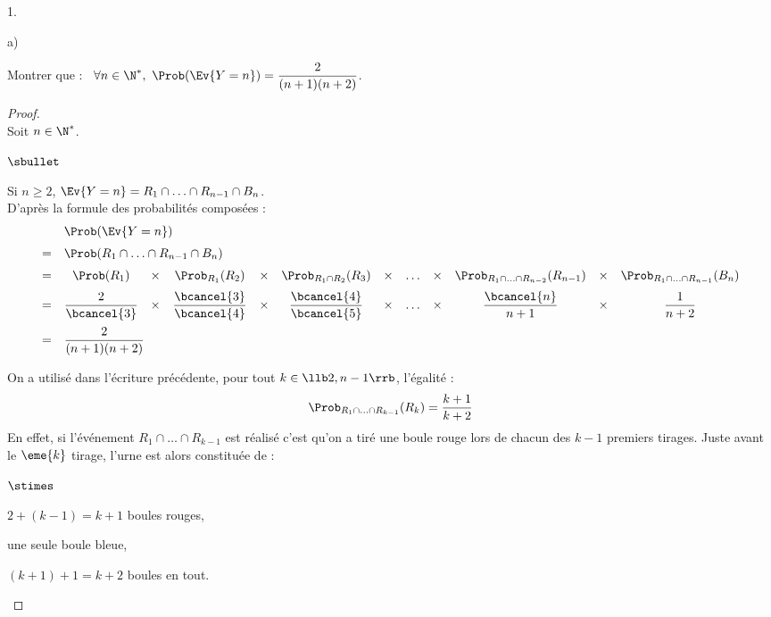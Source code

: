 \documentclass[11pt]{article}%
\begin{document}
\begin{noliste}{1.}
  \setcounter{enumi}{2}
\item
  \begin{noliste}{a)}
  \item Montrer que : \ $\forall n \in \N^*, \ \Prob(\Ev{Y = n}) =
    \dfrac{2}{(n+1)(n+2)}$.

    \begin{proof}~\\
      Soit $n \in \N^*$.
      \begin{noliste}{$\sbullet$}
      \item Si $n \geq 2$, $\Ev{Y = n} = R_1 \cap \ldots \cap 
      R_{n-1} \cap B_n$.\\
        D'après la formule des probabilités composées :
        \[
        \begin{array}{cccccccccccc}
          & \multicolumn{11}{l}{\Prob(\Ev{Y = n})} \\[.2cm]
          = & \multicolumn{11}{l}{\Prob(R_1 \cap \ldots \cap R_{n-1}
            \cap B_n)} \\[.2cm] 
          = & \Prob(R_1) & \times & \Prob_{R_1}(R_2) & \times & 
	  \Prob_{R_1
            \cap R_2}(R_3) & \times & \ldots & \times & \Prob_{R_1 \cap 
	    \ldots
            \cap R_{n-2}}(R_{n-1}) & \times & \Prob_{R_1 \cap \ldots 
	    \cap
            R_{n-1}}(B_n) \\[.2cm]
          = & \dfrac{2}{\bcancel{3}} & \times &
          \dfrac{\bcancel{3}}{\bcancel{4}} & \times & 
          \dfrac{\bcancel{4}}{\bcancel{5}} & \times & \ldots &
          \times & \dfrac{\bcancel{n}}{n+1} & \times &
          \dfrac{1}{n+2} \\[.4cm]
          = & \multicolumn{11}{l}{\dfrac{2}{(n+1)(n+2)}}
        \end{array}         
        \]

      \item On a utilisé dans l'écriture précédente, pour tout $k
        \in \llb 2, n-1 \rrb$, l'égalité :
        \[
        \Prob_{R_1 \cap \ldots \cap R_{k-1}}(R_k) = \dfrac{k+1}{k+2}
        \]
        En effet, si l'événement $R_1 \cap \ldots \cap R_{k-1}$ est
        réalisé c'est qu'on a tiré une boule rouge lors de chacun des
        $k-1$ premiers tirages. Juste avant le $\eme{k}$ tirage,
        l'urne est alors constituée de :
        \begin{noliste}{$\stimes$}
        \item $2 + (k-1) = k+1$ boules rouges,
        \item une seule boule bleue,
        \item $(k+1) + 1 = k+2$ boules en tout.
        \end{noliste}


\end{noliste}
\end{proof}
\end{noliste}
\end{noliste}
\end{document}
